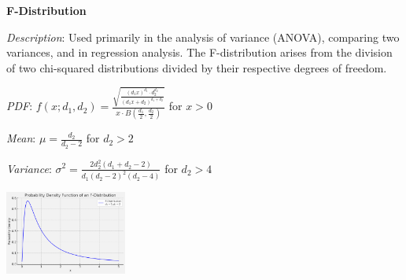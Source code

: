 \documentclass{article}
\begin{document}
\begin{mdframed}
  \textbf{F-Distribution}
  
  \textit{Description}: Used primarily in the analysis of variance (ANOVA), comparing two variances, and in regression analysis. The F-distribution arises from the division of two chi-squared distributions divided by their respective degrees of freedom.
  \begin{multicols}{2}
    \textit{PDF}: $f(x; d_1, d_2) = \frac{\sqrt{\frac{(d_1 x)^{d_1} \cdot d_2^{d_2}}{(d_1 x + d_2)^{d_1 + d_2}}}}{x \cdot B\left(\frac{d_1}{2}, \frac{d_2}{2}\right)}$ for $x > 0$
  
  \textit{Mean}: $\mu = \frac{d_2}{d_2 - 2}$ for $d_2 > 2$
  
  \textit{Variance}: $\sigma^2 = \frac{2d_2^2(d_1 + d_2 - 2)}{d_1(d_2 - 2)^2(d_2 - 4)}$ for $d_2 > 4$
  \begin{center}
    \includegraphics*[width=0.3\textwidth]{fdistribution.png}
  \end{center}
          
  \end{multicols}
  
  
\end{mdframed}
\end{document}
